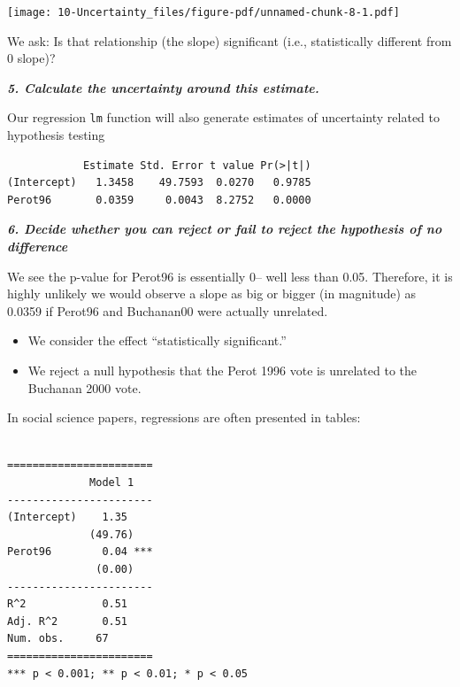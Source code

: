 \documentclass[
  letterpaper,
  DIV=11,
  numbers=noendperiod]{scrreprt}
\newenvironment{Shaded}{\begin{snugshade}}{\end{snugshade}}
\newcommand{\AttributeTok}[1]{\textcolor[rgb]{0.40,0.45,0.13}{#1}}
\newcommand{\DecValTok}[1]{\textcolor[rgb]{0.68,0.00,0.00}{#1}}
\newcommand{\FunctionTok}[1]{\textcolor[rgb]{0.28,0.35,0.67}{#1}}
\newcommand{\NormalTok}[1]{\textcolor[rgb]{0.00,0.23,0.31}{#1}}
\newcommand{\SpecialCharTok}[1]{\textcolor[rgb]{0.37,0.37,0.37}{#1}}
\providecommand{\tightlist}{%
  \setlength{\itemsep}{0pt}\setlength{\parskip}{0pt}}\usepackage{longtable,booktabs,array}
\begin{document}
\texttt{[image: 10-Uncertainty\_files/figure-pdf/unnamed-chunk-8-1.pdf]}

We ask: Is that relationship (the slope) significant (i.e.,
statistically different from 0 slope)?

\textbf{\emph{5. Calculate the uncertainty around this estimate.}}

Our regression \texttt{lm} function will also generate estimates of
uncertainty related to hypothesis testing

\begin{Shaded}
\end{Shaded}

\begin{verbatim}
            Estimate Std. Error t value Pr(>|t|)
(Intercept)   1.3458    49.7593  0.0270   0.9785
Perot96       0.0359     0.0043  8.2752   0.0000
\end{verbatim}

\textbf{\emph{6. Decide whether you can reject or fail to reject the
hypothesis of no difference}}

We see the p-value for Perot96 is essentially 0-- well less than 0.05.
Therefore, it is highly unlikely we would observe a slope as big or
bigger (in magnitude) as 0.0359 if Perot96 and Buchanan00 were actually
unrelated.

\begin{itemize}
\tightlist
\item
  We consider the effect ``statistically significant.''
\item
  We reject a null hypothesis that the Perot 1996 vote is unrelated to
  the Buchanan 2000 vote.
\end{itemize}

In social science papers, regressions are often presented in tables:

\begin{verbatim}

=======================
             Model 1   
-----------------------
(Intercept)    1.35    
             (49.76)   
Perot96        0.04 ***
              (0.00)   
-----------------------
R^2            0.51    
Adj. R^2       0.51    
Num. obs.     67       
=======================
*** p < 0.001; ** p < 0.01; * p < 0.05
\end{verbatim}
\end{document}
